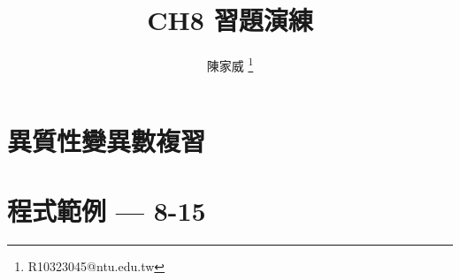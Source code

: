 \documentclass[mathserif]{beamer}
\title{CH8 習題演練}
\author{陳家威 \thanks{R10323045@ntu.edu.tw}}
\begin{document}
    \begin{frame}        
        \maketitle
    \end{frame}

    \section{異質性變異數複習}
    

    \section{程式範例 --- 8-15}
    
\end{document}
